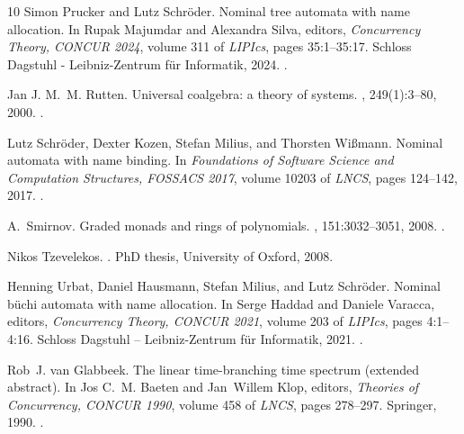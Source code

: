 \documentclass[11pt,a4paper]{amsart}
\theoremstyle{plain}
\numberwithin{equation}{section}
\newcommand{\+}[1]{\mathcal{#1}\xspace}
\theoremstyle{definition}
\begin{document}
\begin{thebibliography}{10}
Simon Prucker and Lutz Schr{\"{o}}der.
\newblock Nominal tree automata with name allocation.
\newblock In Rupak Majumdar and Alexandra Silva, editors, {\em Concurrency
  Theory, {CONCUR} 2024}, volume 311 of {\em LIPIcs}, pages 35:1--35:17.
  Schloss Dagstuhl - Leibniz-Zentrum f{\"{u}}r Informatik, 2024.
\newblock \href {https://doi.org/10.4230/LIPICS.CONCUR.2024.35}
  {}.

Jan J. M.~M. Rutten.
\newblock Universal coalgebra: a theory of systems.
, 249(1):3--80, 2000.
\newblock \href {https://doi.org/10.1016/S0304-3975(00)00056-6}
  {}.

Lutz Schr{\"{o}}der, Dexter Kozen, Stefan Milius, and Thorsten Wi{\ss}mann.
\newblock Nominal automata with name binding.
\newblock In {\em Foundations of Software Science and Computation Structures,
  {FOSSACS} 2017}, volume 10203 of {\em LNCS}, pages 124--142, 2017.
\newblock \href {https://doi.org/10.1007/978-3-662-54458-7_8}
  {}.

A.~Smirnov.
\newblock Graded monads and rings of polynomials.
, 151:3032--3051, 2008.
\newblock \href {https://doi.org/10.1007/s10958-008-9013-7}
  {}.

Nikos Tzevelekos.
.
\newblock PhD thesis, University of Oxford, 2008.

Henning Urbat, Daniel Hausmann, Stefan Milius, and Lutz Schr{\"{o}}der.
\newblock Nominal b{\"{u}}chi automata with name allocation.
\newblock In Serge Haddad and Daniele Varacca, editors, {\em Concurrency
  Theory, {CONCUR} 2021}, volume 203 of {\em LIPIcs}, pages 4:1--4:16. Schloss
  Dagstuhl -- Leibniz-Zentrum f{\"u}r Informatik, 2021.
\newblock \href {https://doi.org/10.4230/LIPICS.CONCUR.2021.4}
  {}.

Rob~J. van Glabbeek.
\newblock The linear time-branching time spectrum (extended abstract).
\newblock In Jos C.~M. Baeten and Jan~Willem Klop, editors, {\em Theories of
  Concurrency, CONCUR 1990}, volume 458 of {\em LNCS}, pages 278--297.
  Springer, 1990.
\newblock \href {https://doi.org/10.1007/BFB0039066}
  {}.

\end{thebibliography}
\end{document}
